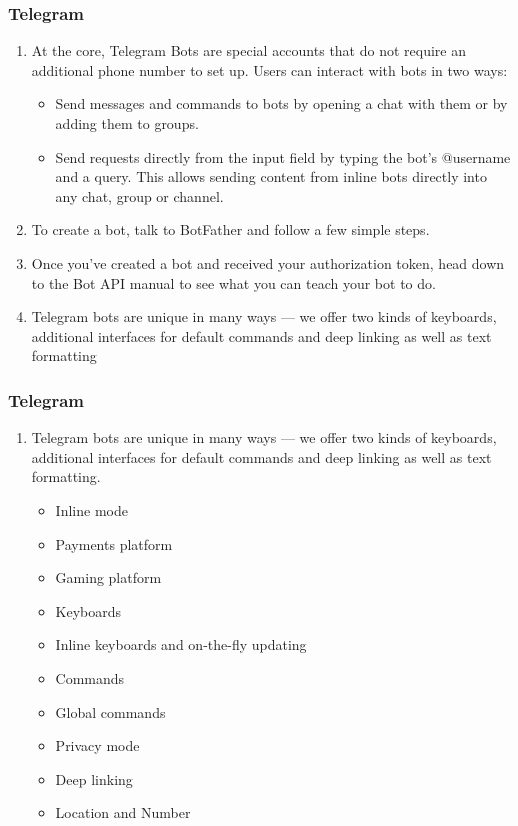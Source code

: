 \documentclass[11pt]{beamer}
\begin{document}
\begin{frame}
\frametitle{Telegram}
\begin{enumerate}
	\item At the core, Telegram Bots are special accounts that do not require an additional phone number to set up. Users can interact with bots in two ways:
	\begin{itemize}
		\item Send messages and commands to bots by opening a chat with them or by adding them to groups.
		\item Send requests directly from the input field by typing the bot's @username and a query. This allows sending content from inline bots directly into any chat, group or channel.
	\end{itemize}
	\item To create a bot, talk to BotFather and follow a few simple steps.
	\item Once you've created a bot and received your authorization token, head down to the Bot API manual to see what you can teach your bot to do.
	\item Telegram bots are unique in many ways — we offer two kinds of keyboards, additional interfaces for default commands and deep linking as well as text formatting
\end{enumerate}
\end{frame}

\begin{frame}
\frametitle{Telegram}
\begin{enumerate}
	\item Telegram bots are unique in many ways — we offer two kinds of keyboards, additional interfaces for default commands and deep linking as well as text formatting.
	\begin{itemize}
		\item Inline mode
		\item Payments platform
		\item Gaming platform
		\item Keyboards
		\item Inline keyboards and on-the-fly updating
		\item Commands
		\item Global commands
		\item Privacy mode
		\item Deep linking
		\item Location and Number
	\end{itemize}
\end{enumerate}
\end{frame}
\end{document}
